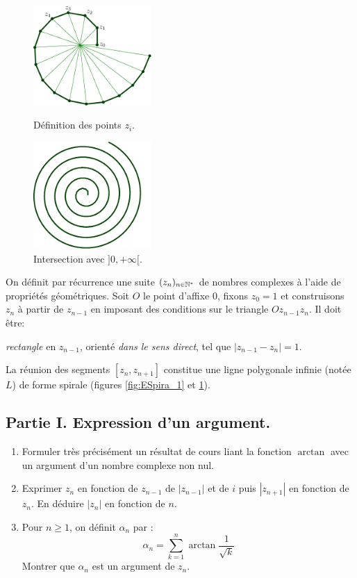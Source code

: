 \begin{figure}[h]
  \centering
  \begin{minipage}{6cm}
    \centering
    \includegraphics[width=4.5cm]{./ESpira_1.pdf}
    \caption{Définition des points $z_i$.}
    \label{fig:ESpira_1}
  \end{minipage}
  \begin{minipage}{6cm}
    \centering
    \includegraphics[width=4.5cm]{./ESpira_2.pdf}
    \caption{Intersection avec $]0,+\infty[$.}
    \label{fig:ESpira_2}
  \end{minipage}
\end{figure}
On définit par récurrence une suite $(z_n)_{n\in \mathbb{N}^*}$ de nombres complexes à l'aide de propriétés géométriques. Soit $O$ le point d'affixe $0$, fixons $z_{0}=1$ et construisons $z_{n}$ à partir de $z_{n-1}$ en imposant des conditions sur le triangle $Oz_{n-1}z_{n}$. Il doit être:
\begin{center}
  \emph{rectangle} en $ z_{n-1}$,
  \hspace{0.5cm} orient{\'e} \emph{dans le sens direct},
  \hspace{0.5cm} tel que $ |z_{n-1}- z_{n}|=1$.
\end{center}
La r{\'e}union des segments $[ z_{n},z_{n+1}]$ constitue une ligne polygonale infinie (notée $L$) de forme spirale (figures \ref{fig:ESpira_1} et \ref{fig:ESpira_2}).

\subsection*{Partie I. Expression d'un argument.}
\begin{enumerate}
\item Formuler très précisément un résultat de cours liant la fonction $\arctan$ avec un argument d'un nombre complexe non nul.
\item Exprimer $z_n$ en fonction de $z_{n-1}$ de $|z_{n-1}|$ et de $i$ puis $|z_{n+1}|$ en fonction de $z_n$. En déduire $|z_{n}|$ en fonction de $n$. 
\item Pour $n\geq 1$, on définit $\alpha_n$ par :
\[\alpha_{n}=\sum_{k=1}^{n}\arctan\frac{1}{\sqrt{k}}\]
Montrer que $\alpha_n$ est un argument de $ z_{n}$.
\end{enumerate}

